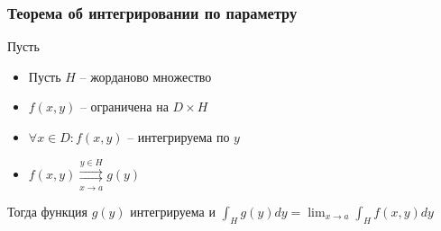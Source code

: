 \subsubsection{Теорема об интегрировании по параметру}
\begin{theorem*}
    Пусть
    \begin{itemize}
        \item Пусть $H$ -- жорданово множество
        \item $f(x, y)$ -- ограничена на $D \times H$
        \item $\forall x \in D: f(x, y)$ -- интегрируема по $y$
        \item $f(x, y) \overset{y \in H}{\underset{x \to a}{\rightrightarrows}} g(y)$
    \end{itemize}
    Тогда функция $g(y)$ интегрируема и $\displaystyle \int_{H} g(y)dy = 
    \lim_{x \to a} \int_{H}f(x,y)dy$
\end{theorem*}
